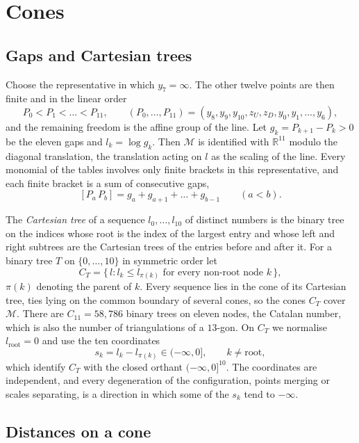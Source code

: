 \documentclass[11pt,a4paper]{article}
\theoremstyle{definition}
\theoremstyle{remark}
\newcommand{\br}[2]{[#1\,#2]}
\newcommand{\Mo}{\mathcal{M}}
\begin{document}
\section{Cones}\label{sec:cones}

\subsection{Gaps and Cartesian trees}
Choose the representative in which $y_7 = \infty$. The other twelve points are then finite and in the
linear order
\[
P_0 < P_1 < \dots < P_{11}, \qquad (P_0, \dots, P_{11}) = (y_8, y_9, y_{10}, z_U, z_D, y_0, y_1, \dots, y_6),
\]
and the remaining freedom is the affine group of the line. Let $g_k = P_{k+1} - P_k > 0$ be the eleven
gaps and $l_k = \log g_k$. Then $\Mo$ is identified with $\mathbb{R}^{11}$ modulo the diagonal translation,
the translation acting on $l$ as the scaling of the line. Every monomial of the tables involves only finite
brackets in this representative, and each finite bracket is a sum of consecutive gaps,
\[
\br{P_a}{P_b} = g_a + g_{a+1} + \dots + g_{b-1}\qquad (a < b).
\]

The \emph{Cartesian tree} \cite{Vuillemin} of a sequence $l_0, \dots, l_{10}$ of distinct numbers is the
binary tree on the indices whose root is the index of the largest entry and whose left and right subtrees
are the Cartesian trees of the entries before and after it. For a binary tree $T$ on $\{0, \dots, 10\}$
in symmetric order let
\[
  C_T = \{\, l : l_k \le l_{\pi(k)} \text{ for every non-root node } k \,\},
\]
$\pi(k)$ denoting the parent of $k$. Every sequence lies in the cone of its Cartesian tree, ties lying on
the common boundary of several cones, so the cones $C_T$ cover $\Mo$. There are $C_{11} = 58{,}786$ binary
trees on eleven nodes, the Catalan number, which is also the number of triangulations of a $13$-gon. On
$C_T$ we normalise $l_{\mathrm{root}} = 0$ and use the ten coordinates
\[
  s_k = l_k - l_{\pi(k)} \in (-\infty, 0], \qquad k \ne \mathrm{root},
\]
which identify $C_T$ with the closed orthant $(-\infty, 0]^{10}$. The coordinates are independent, and
every degeneration of the configuration, points merging or scales separating, is a direction in which some
of the $s_k$ tend to $-\infty$.

\subsection{Distances on a cone}
\end{document}

